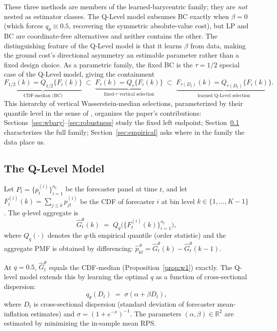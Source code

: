 These three methods are members of the learned-barycentric family; they are \emph{not} nested
as estimator classes.  The Q-Level model subsumes BC exactly when $\beta = 0$
(which forces $q_\theta \equiv 0.5$, recovering the symmetric absolute-value cost), but LP
and BC are coordinate-free alternatives and neither contains the other.
The distinguishing feature of the Q-Level model is that it learns $\beta$ from data,
making the ground cost's directional asymmetry an estimable parameter rather than a fixed design choice.
As a parametric family, the fixed BC is the $\tau = 1/2$ special case of the Q-Level model,
giving the containment
\begin{equation}
  \underbrace{F_{1/2}(k) = Q_{1/2}\{F_i(k)\}}_{\text{CDF-median (BC)}}
  \;\subset\;
  \underbrace{F_\tau(k) = Q_\tau\{F_i(k)\}}_{\text{fixed-}\tau\text{ vertical selection}}
  \;\subset\;
  \underbrace{F_{\tau(D_t)}(k) = Q_{\tau(D_t)}\{F_i(k)\}}_{\text{learned Q-Level selection}}.
  \label{eq:selection_hierarchy}
\end{equation}
This hierarchy of vertical Wasserstein-median selections, parameterized by their quantile level in the sense of \cite{carlier23}, organizes the paper's contributions:
Sections~\ref{sec:wbary}--\ref{sec:robustness} study the fixed left endpoint;
Section~\ref{sec:qlevel} characterizes the full family;
Section~\ref{sec:empirical} asks where in the family the data place us.

\subsection{The Q-Level Model}
\label{sec:qlevel}

Let $P_t = \{p^{(i)}_t\}_{i=1}^{n_t}$ be the forecaster panel at time $t$, and let
$F^{(i)}_t(k) = \sum_{j \leq k} p^{(i)}_{jt}$ be the CDF of forecaster $i$ at bin level
$k \in \{1,\ldots,K-1\}$.  The $q$-level aggregate is
\begin{equation}
  \hat{G}_t^\theta(k)
    \;=\; Q_q\!\bigl(\{F^{(i)}_t(k)\}_{i=1}^{n_t}\bigr),
  \label{eq:qlevel}
\end{equation}
where $Q_q(\cdot)$ denotes the $q$-th empirical quantile (order statistic) and the
aggregate PMF is obtained by differencing: $\hat{p}^{\,\theta}_{kt} = \hat{G}_t^\theta(k) - \hat{G}_t^\theta(k-1)$.

At $q = 0.5$, $\hat{G}_t^\theta$ equals the CDF-median (Proposition~\ref{prop:w1}) exactly.
The Q-level model extends this by learning the optimal $q$ as a function of cross-sectional
dispersion:
\begin{equation}
  q_\theta(D_t) \;=\; \sigma(\alpha + \beta D_t),
  \label{eq:qlevel_param}
\end{equation}
where $D_t$ is cross-sectional dispersion (standard deviation of forecaster mean-inflation
estimates) and $\sigma = (1+e^{-x})^{-1}$.  The parameters $(\alpha, \beta) \in \mathbb{R}^2$
are estimated by minimizing the in-sample mean RPS.

